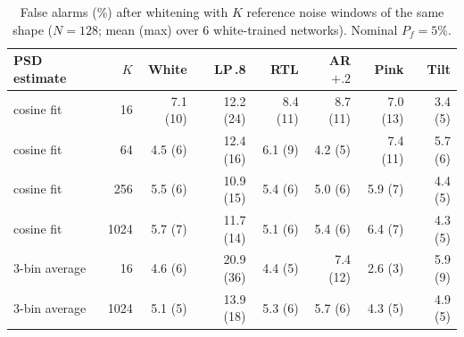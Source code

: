 \begin{table}[t]
\centering
\caption{False alarms (\%) after whitening with $K$ reference noise windows of the same shape ($N=128$; mean (max) over 6 white-trained networks). Nominal $P_f=5\%$.}
\label{tab:whitening}
\footnotesize
\setlength{\tabcolsep}{2.2pt}
\begin{tabular}{lrrrrrrr}
\toprule
PSD estimate & $K$ & White & LP\,.8 & RTL & AR$+.2$ & Pink & Tilt \\
\midrule
cosine fit & 16 & 7.1 (10) & 12.2 (24) & 8.4 (11) & 8.7 (11) & 7.0 (13) & 3.4 (5) \\
cosine fit & 64 & 4.5 (6) & 12.4 (16) & 6.1 (9) & 4.2 (5) & 7.4 (11) & 5.7 (6) \\
cosine fit & 256 & 5.5 (6) & 10.9 (15) & 5.4 (6) & 5.0 (6) & 5.9 (7) & 4.4 (5) \\
cosine fit & 1024 & 5.7 (7) & 11.7 (14) & 5.1 (6) & 5.4 (6) & 6.4 (7) & 4.3 (5) \\
3-bin average & 16 & 4.6 (6) & 20.9 (36) & 4.4 (5) & 7.4 (12) & 2.6 (3) & 5.9 (9) \\
3-bin average & 1024 & 5.1 (5) & 13.9 (18) & 5.3 (6) & 5.7 (6) & 4.3 (5) & 4.9 (5) \\
\bottomrule
\end{tabular}
\end{table}
